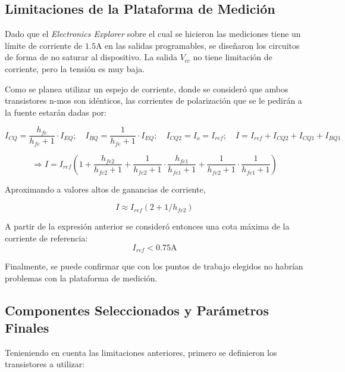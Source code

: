 \subsection{Limitaciones de la Plataforma de Medición} \label{sec:EE_limits}

Dado que el \textit{Electronics Explorer} sobre el cual se hicieron las mediciones tiene un límite de corriente de $1.5 \si{\ampere}$ en las salidas programables, se diseñaron los circuitos de forma de no saturar al dispositivo. La salida $V_{cc}$ no tiene limitación de corriente, pero la tensión es muy baja.

Como se planea utilizar un espejo de corriente, donde se consideró que ambos transistores n-mos son idénticos, las corrientes de polarización que se le pedirán a la fuente estarán dadas por:

\begin{equation*}
    I_{CQ} = \frac{h_{fe}}{h_{fe}+1} \cdot I_{EQ}; \quad I_{BQ} = \frac{1}{h_{fe}+1} \cdot I_{EQ}; \quad
    I_{CQ2} = I_o = I_{ref}; \quad I = I_{ref} + I_{CQ2} + I_{CQ1} + I_{BQ1}
\end{equation*}

\begin{equation}
    \Rightarrow I = I_{ref} \left(1 + \frac{h_{fe2}}{h_{fe2}+1} + \frac{1}{h_{fe2}+1}\cdot\frac{h_{fe1}}{h_{fe1}+1}+\frac{1}{h_{fe2}+1}\cdot\frac{1}{h_{fe1}+1}\right)
\end{equation}

Aproximando a valores altos de ganancias de corriente,

\begin{equation}
    I \approx I_{ref}\left(2+1/h_{fe2}\right)
\end{equation}

A partir de la expresión anterior se consideró entonces una cota máxima de la corriente de referencia:
\begin{equation}
    I_{ref} < 0.75 \si{\ampere}
    \label{eq:Iref}
\end{equation}

Finalmente, se puede confirmar que con los puntos de trabajo elegidos no habrían problemas con la plataforma de medición.

\subsection{Componentes Seleccionados y Parámetros Finales}

Tenieniendo en cuenta las limitaciones anteriores, primero se definieron los transistores a utilizar:

